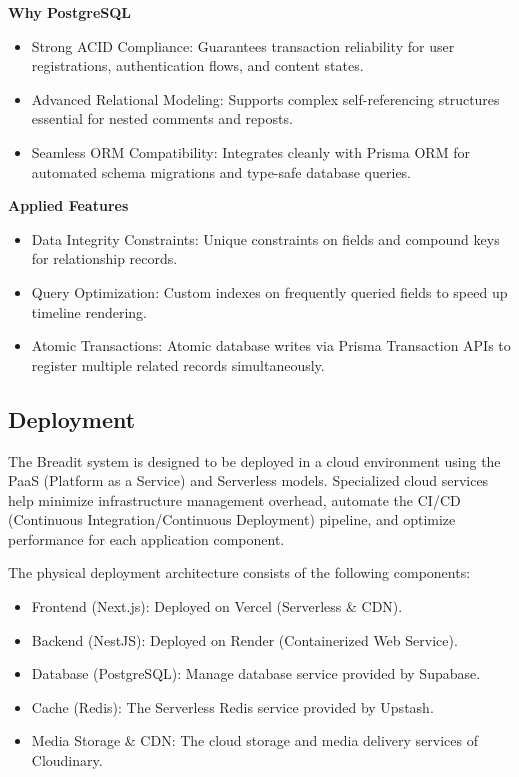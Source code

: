 \medskip\noindent\textbf{Why PostgreSQL}\\[2pt]
\begin{itemize}
  \item Strong ACID Compliance: Guarantees transaction reliability for user registrations, authentication flows, and content states.
  \item Advanced Relational Modeling: Supports complex self-referencing structures essential for nested comments and reposts.
  \item Seamless ORM Compatibility: Integrates cleanly with Prisma ORM for automated schema migrations and type-safe database queries.
\end{itemize}

\medskip\noindent\textbf{Applied Features}\\[2pt]
\begin{itemize}
  \item Data Integrity Constraints: Unique constraints on fields and compound keys for relationship records.
  \item Query Optimization: Custom indexes on frequently queried fields to speed up timeline rendering.
  \item Atomic Transactions: Atomic database writes via Prisma Transaction APIs to register multiple related records simultaneously.
\end{itemize}

\subsection{Deployment}

The Breadit system is designed to be deployed in a cloud environment using the PaaS (Platform as a Service) and Serverless models. Specialized cloud services help minimize infrastructure management overhead, automate the CI/CD (Continuous Integration/Continuous Deployment) pipeline, and optimize performance for each application component.

The physical deployment architecture consists of the following components:
\begin{itemize}
  \item Frontend (Next.js): Deployed on Vercel (Serverless \& CDN).
  \item Backend (NestJS): Deployed on Render (Containerized Web Service).
  \item Database (PostgreSQL): Manage database service provided by Supabase.
  \item Cache (Redis): The Serverless Redis service provided by Upstash.
  \item Media Storage \& CDN: The cloud storage and media delivery services of Cloudinary.
\end{itemize}

